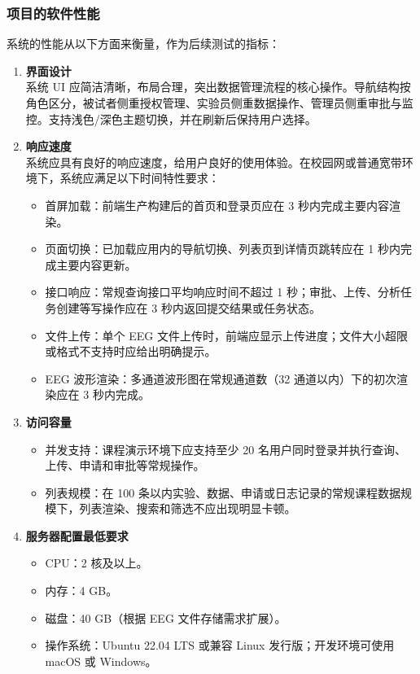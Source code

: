 \subsubsection{项目的软件性能}

系统的性能从以下方面来衡量，作为后续测试的指标：

\begin{enumerate}[(1)]
  \item \textbf{界面设计}\\
  系统 UI 应简洁清晰，布局合理，突出数据管理流程的核心操作。导航结构按角色区分，被试者侧重授权管理、实验员侧重数据操作、管理员侧重审批与监控。支持浅色/深色主题切换，并在刷新后保持用户选择。

  \item \textbf{响应速度}\\
  系统应具有良好的响应速度，给用户良好的使用体验。在校园网或普通宽带环境下，系统应满足以下时间特性要求：
    \begin{itemize}
      \item 首屏加载：前端生产构建后的首页和登录页应在 3 秒内完成主要内容渲染。
      \item 页面切换：已加载应用内的导航切换、列表页到详情页跳转应在 1 秒内完成主要内容更新。
      \item 接口响应：常规查询接口平均响应时间不超过 1 秒；审批、上传、分析任务创建等写操作应在 3 秒内返回提交结果或任务状态。
      \item 文件上传：单个 EEG 文件上传时，前端应显示上传进度；文件大小超限或格式不支持时应给出明确提示。
      \item EEG 波形渲染：多通道波形图在常规通道数（32 通道以内）下的初次渲染应在 3 秒内完成。
    \end{itemize}

  \item \textbf{访问容量}
    \begin{itemize}
      \item 并发支持：课程演示环境下应支持至少 20 名用户同时登录并执行查询、上传、申请和审批等常规操作。
      \item 列表规模：在 100 条以内实验、数据、申请或日志记录的常规课程数据规模下，列表渲染、搜索和筛选不应出现明显卡顿。
    \end{itemize}

  \item \textbf{服务器配置最低要求}
    \begin{itemize}
      \item CPU：2 核及以上。
      \item 内存：4 GB。
      \item 磁盘：40 GB（根据 EEG 文件存储需求扩展）。
      \item 操作系统：Ubuntu 22.04 LTS 或兼容 Linux 发行版；开发环境可使用 macOS 或 Windows。
    \end{itemize}


\end{enumerate}
